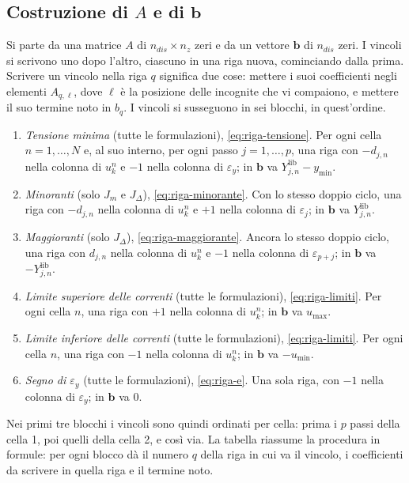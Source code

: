 \documentclass[11pt,a4paper]{article}
\newcommand{\vett}[1]{\boldsymbol{#1}}      %
\newcommand{\lib}{\mathrm{lib}}             %
\begin{document}
\subsection{Costruzione di $A$ e di $\vett{b}$}\label{sec:passi-vincoli}

Si parte da una matrice $A$ di $n_{dis} \times n_z$ zeri e da un vettore $\vett{b}$ di
$n_{dis}$ zeri. I vincoli si scrivono uno dopo l'altro, ciascuno in una riga
nuova, cominciando dalla prima. Scrivere un vincolo nella riga $q$ significa
due cose: mettere i suoi coefficienti negli elementi $A_{q,\ell}$, dove $\ell$ è la
posizione delle incognite che vi compaiono, e mettere il suo termine noto in
$b_q$. I vincoli si susseguono in sei blocchi, in quest'ordine.
\begin{enumerate}
  \item \emph{Tensione minima} (tutte le formulazioni),
        \eqref{eq:riga-tensione}. Per ogni cella $n = 1,\dots,N$ e, al suo
        interno, per ogni passo $j = 1,\dots,p$, una riga con $-d_{j,n}$ nella
        colonna di $u^n_k$ e $-1$ nella colonna di $\varepsilon_y$; in $\vett{b}$ va
        $Y^\lib_{j,n} - y_{\min}$.
  \item \emph{Minoranti} (solo $J_m$ e $J_\Delta$),
        \eqref{eq:riga-minorante}. Con lo stesso doppio ciclo, una riga con
        $-d_{j,n}$ nella colonna di $u^n_k$ e $+1$ nella colonna di
        $\varepsilon_j$; in $\vett{b}$ va $Y^\lib_{j,n}$.
  \item \emph{Maggioranti} (solo $J_\Delta$), \eqref{eq:riga-maggiorante}.
        Ancora lo stesso doppio ciclo, una riga con $d_{j,n}$ nella colonna di
        $u^n_k$ e $-1$ nella colonna di $\varepsilon_{p+j}$; in $\vett{b}$ va
        $-Y^\lib_{j,n}$.
  \item \emph{Limite superiore delle correnti} (tutte le formulazioni),
        \eqref{eq:riga-limiti}. Per ogni cella $n$, una riga con $+1$ nella
        colonna di $u^n_k$; in $\vett{b}$ va $u_{\max}$.
  \item \emph{Limite inferiore delle correnti} (tutte le formulazioni),
        \eqref{eq:riga-limiti}. Per ogni cella $n$, una riga con $-1$ nella
        colonna di $u^n_k$; in $\vett{b}$ va $-u_{\min}$.
  \item \emph{Segno di $\varepsilon_y$} (tutte le formulazioni), \eqref{eq:riga-e}. Una
        sola riga, con $-1$ nella colonna di $\varepsilon_y$; in $\vett{b}$ va $0$.
\end{enumerate}
Nei primi tre blocchi i vincoli sono quindi ordinati per cella: prima i $p$
passi della cella 1, poi quelli della cella 2, e così via. La tabella riassume
la procedura in formule: per ogni blocco dà il numero $q$ della riga in cui va
il vincolo, i coefficienti da scrivere in quella riga e il termine noto.
\end{document}
